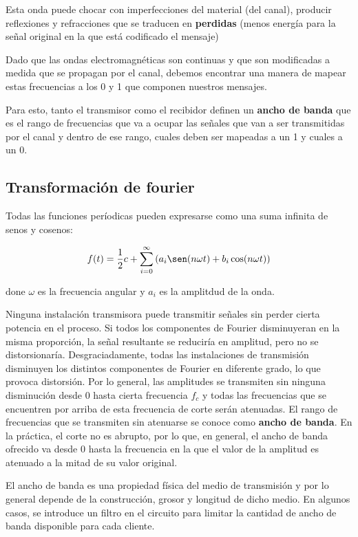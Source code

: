 Esta onda puede chocar con imperfecciones del material (del canal), producir reflexiones y refracciones que se traducen en \textbf{perdidas} (menos energía para la señal original en la que está codificado el mensaje)

Dado que las ondas electromagnéticas son continuas y que son modificadas a medida que se propagan por el canal, debemos encontrar una manera de mapear estas frecuencias a los 0 y 1 que componen nuestros mensajes.

Para esto, tanto el transmisor como el recibidor definen un \textbf{ancho de banda} que es el rango de frecuencias que va a ocupar las señales que van a ser transmitidas por el canal y dentro de ese rango, cuales deben ser mapeadas a un 1 y cuales a un 0.

\subsection{Transformación de fourier}
Todas las funciones períodicas pueden expresarse como una suma infinita de senos y cosenos:

\[f(t) = \frac{1}{2}c + \sum_{i=0}^\infty \left(a_i\sen(n\omega t) + b_i\cos(n\omega t)\right)\]

done \(\omega\) es la frecuencia angular y \(a_i\) es la amplitdud de la onda.

Ninguna instalación transmisora puede transmitir señales sin perder cierta potencia en el proceso. Si todos los componentes de Fourier disminuyeran en la misma proporción, la señal resultante se reduciría en amplitud, pero no se distorsionaría. Desgraciadamente, todas las instalaciones de transmisión disminuyen los distintos componentes de Fourier en diferente grado, lo que provoca distorsión. Por lo general, las amplitudes se transmiten sin ninguna disminución desde 0 hasta cierta frecuencia \(f_c\) y todas las frecuencias que se encuentren por arriba de esta frecuencia de corte serán atenuadas. El rango de frecuencias que se transmiten sin atenuarse se conoce como \textbf{ancho de banda}. En la práctica, el corte no es abrupto, por lo que, en general, el ancho de banda ofrecido va desde 0 hasta la frecuencia en la que el valor de la amplitud es atenuado a la mitad de su valor original.

El ancho de banda es una propiedad física del medio de transmisión y por lo general depende
de la construcción, grosor y longitud de dicho medio. En algunos casos, se introduce un filtro en el
circuito para limitar la cantidad de ancho de banda disponible para cada cliente.

